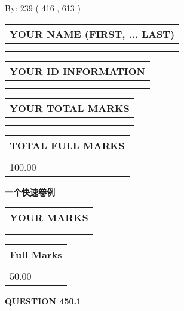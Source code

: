 \documentclass{ctexart}
\begin{document}
   
\hspace{1.0in} By: 
 239 ( 416 ,  613 )
   
   
   
   
\newpage 
\setcounter{page}{ 
   450001 } 
   
   
   
   
\noindent\begin{tabular}{|l|}
\hline
YOUR NAME (FIRST, ... LAST)  \\
\hline
 \\ 
 \\ 
\hline
\end{tabular}
\hspace{0.05in} \begin{tabular}{|l|}
\hline
 YOUR   ID   INFORMATION  \\
\hline
 \\ 
 \\ 
\hline
\end{tabular}
   
   
\vspace{0.2in}\noindent\begin{tabular}{|l|}
\hline
YOUR TOTAL MARKS  \\
\hline
 \\ 
 \\ 
\hline
\end{tabular}
\hspace{0.05in} \begin{tabular}{|l|}
\hline
TOTAL FULL MARKS  \\
\hline
 \\ 
100.00 \\
\hline
\end{tabular}
   
   
 \vspace{0.2in}
{\LARGE {\textbf{ 一个快速卷例}}}
   
   
  
\vspace{0.2in}
  
\noindent\begin{tabular}{|l|}
\hline
 YOUR MARKS  \\
\hline
 \\ 
 \\ 
\hline
\end{tabular}
\hspace{0.05in} \begin{tabular}{|l|}
\hline
 Full Marks  \\
\hline
 \\ 
50.00 \\
\hline
\end{tabular}
{\textbf{\Large{QUESTION
450.1 
}}}
  
\end{document}
